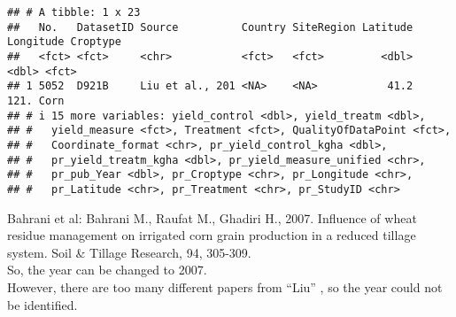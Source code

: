 \documentclass[
]{article}
\newenvironment{Shaded}{\begin{snugshade}}{\end{snugshade}}
\newcommand{\AttributeTok}[1]{\textcolor[rgb]{0.13,0.29,0.53}{#1}}
\newcommand{\CommentTok}[1]{\textcolor[rgb]{0.56,0.35,0.01}{\textit{#1}}}
\newcommand{\ConstantTok}[1]{\textcolor[rgb]{0.56,0.35,0.01}{#1}}
\newcommand{\DecValTok}[1]{\textcolor[rgb]{0.00,0.00,0.81}{#1}}
\newcommand{\FunctionTok}[1]{\textcolor[rgb]{0.13,0.29,0.53}{\textbf{#1}}}
\newcommand{\NormalTok}[1]{#1}
\newcommand{\OtherTok}[1]{\textcolor[rgb]{0.56,0.35,0.01}{#1}}
\newcommand{\SpecialCharTok}[1]{\textcolor[rgb]{0.81,0.36,0.00}{\textbf{#1}}}
\newcommand{\StringTok}[1]{\textcolor[rgb]{0.31,0.60,0.02}{#1}}
\begin{document}
\begin{Shaded}
\end{Shaded}

\begin{verbatim}
## # A tibble: 1 x 23
##   No.   DatasetID Source          Country SiteRegion Latitude Longitude Croptype
##   <fct> <fct>     <chr>           <fct>   <fct>         <dbl>     <dbl> <fct>   
## 1 5052  D921B     Liu et al., 201 <NA>    <NA>           41.2      121. Corn    
## # i 15 more variables: yield_control <dbl>, yield_treatm <dbl>,
## #   yield_measure <fct>, Treatment <fct>, QualityOfDataPoint <fct>,
## #   Coordinate_format <chr>, pr_yield_control_kgha <dbl>,
## #   pr_yield_treatm_kgha <dbl>, pr_yield_measure_unified <chr>,
## #   pr_pub_Year <dbl>, pr_Croptype <chr>, pr_Longitude <chr>,
## #   pr_Latitude <chr>, pr_Treatment <chr>, pr_StudyID <chr>
\end{verbatim}

Bahrani et al: Bahrani M., Raufat M., Ghadiri H., 2007. Influence of
wheat residue management on irrigated corn grain production in a reduced
tillage system. Soil \& Tillage Research, 94, 305-309.\\
So, the year can be changed to 2007.\\
However, there are too many different papers from ``Liu'' , so the year
could not be identified.
\end{document}
